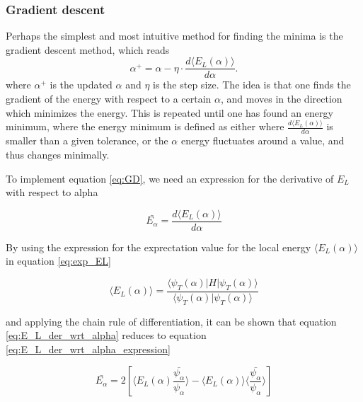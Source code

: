 \documentclass[norsk,a4paper,12pt]{article}
\begin{document}
\subsubsection{Gradient descent}
Perhaps the simplest and most intuitive method for finding the minima is the gradient descent method, which reads
\begin{equation}
\label{eq:GD}
\alpha^+=\alpha - \eta\cdot\frac{d\langle E_L(\alpha)\rangle}{d\alpha}.
\end{equation}
where $\alpha^+$ is the updated $\alpha$ and $\eta$ is the step size. The idea is that one finds the gradient of the energy with respect to a certain $\alpha$, and moves in the direction which minimizes the energy. This is repeated until one has found an energy minimum, where the energy minimum is defined as either where $\frac{d\langle E_L(\alpha)\rangle}{d\alpha}$ is smaller than a given tolerance, or the $\alpha$ energy fluctuates around a value, and thus changes minimally.
\par 
\vspace{3mm}

To implement equation \ref{eq:GD}, we need an expression for the derivative of $E_L$ with respect to alpha

\begin{equation}
	\label{eq:E_L_der_wrt_alpha}
	\bar{E_{\alpha}} = \frac{d \langle E_L (\alpha) \rangle}{d \alpha}
\end{equation}

By using the expression for the exprectation value for the local energy $ \langle E_L (\alpha) \rangle$ in equation \ref{eq:exp_EL} 

\begin{equation}
	\label{eq:exp_EL}
	\langle E_L (\alpha) \rangle = \frac{ \langle \psi_T(\alpha) | H | \psi_T(\alpha)  \rangle}{ \langle \psi_T(\alpha)  |  \psi_T(\alpha)  \rangle }
\end{equation}

and applying the chain rule of differentiation, it can be shown that equation \ref{eq:E_L_der_wrt_alpha} reduces to equation \ref{eq:E_L_der_wrt_alpha_expression}

\begin{equation}
	\label{eq:E_L_der_wrt_alpha_expression}
	\bar{E_{\alpha}} = 2 [\langle E_L (\alpha)  \frac{ \bar{\psi_{\alpha}}}{\psi_{\alpha}}\rangle - \langle E_L (\alpha) \rangle \langle \frac{\bar{\psi_{\alpha}}}{\psi_{\alpha}} \rangle ]
\end{equation}
\end{document}
